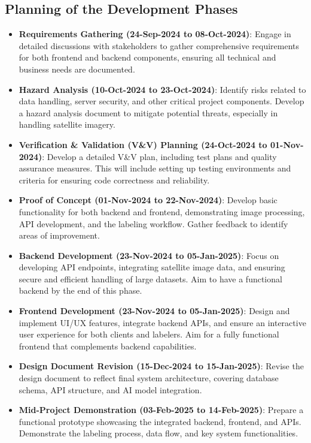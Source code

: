 \documentclass[12pt]{article}
\begin{document}
\subsection{Planning of the Development Phases}
\begin{itemize} 
    \item \textbf{Requirements Gathering (24-Sep-2024 to 08-Oct-2024)}: Engage in detailed discussions with stakeholders to gather comprehensive requirements for both frontend and backend components, ensuring all technical and business needs are documented.
    \item \textbf{Hazard Analysis (10-Oct-2024 to 23-Oct-2024)}: Identify risks related to data handling, server security, and other critical project components. Develop a hazard analysis document to mitigate potential threats, especially in handling satellite imagery.
    \item \textbf{Verification \& Validation (V\&V) Planning (24-Oct-2024 to 01-Nov-2024)}: Develop a detailed V\&V plan, including test plans and quality assurance measures. This will include setting up testing environments and criteria for ensuring code correctness and reliability.
    \item \textbf{Proof of Concept (01-Nov-2024 to 22-Nov-2024)}: Develop basic functionality for both backend and frontend, demonstrating image processing, API development, and the labeling workflow. Gather feedback to identify areas of improvement.
    \item \textbf{Backend Development (23-Nov-2024 to 05-Jan-2025)}: Focus on developing API endpoints, integrating satellite image data, and ensuring secure and efficient handling of large datasets. Aim to have a functional backend by the end of this phase.
    \item \textbf{Frontend Development (23-Nov-2024 to 05-Jan-2025)}: Design and implement UI/UX features, integrate backend APIs, and ensure an interactive user experience for both clients and labelers. Aim for a fully functional frontend that complements backend capabilities.
    \item \textbf{Design Document Revision (15-Dec-2024 to 15-Jan-2025)}: Revise the design document to reflect final system architecture, covering database schema, API structure, and AI model integration.
    \item \textbf{Mid-Project Demonstration (03-Feb-2025 to 14-Feb-2025)}: Prepare a functional prototype showcasing the integrated backend, frontend, and APIs. Demonstrate the labeling process, data flow, and key system functionalities.

\end{itemize}
\end{document}
